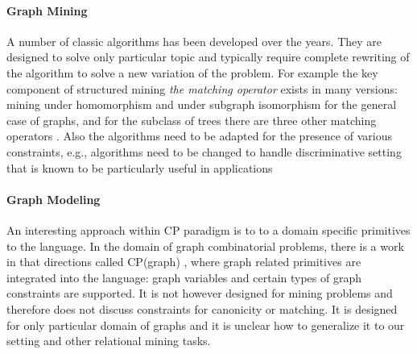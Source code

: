 
\paragraph{Graph Mining} A number of classic algorithms has been developed over the years. They are designed to solve only particular topic and typically require complete rewriting of the algorithm to solve a new variation of the problem. For example the key component of structured mining \textit{the matching operator} exists in many versions: mining under homomorphism \citep{theta_subsumption} and under subgraph isomorphism \citep{gspan} for the general case of graphs, and for the subclass of trees there are three other matching operators \citep{subtree_overview}. Also the algorithms need to be adapted for the presence of various constraints, e.g., algorithms need to be changed to handle discriminative setting that is known to be particularly useful in applications \citep{pattern_mining_classification}

\paragraph{Graph Modeling} An interesting approach within CP paradigm is to to a domain specific primitives to the language. In the domain of graph combinatorial problems, there is a work in that directions called CP(graph) \citep{cp_graph}, where graph related primitives are integrated into the language: graph variables and certain types of graph constraints are supported. It is not however designed for mining problems and therefore does not discuss constraints for canonicity or matching. It is designed for only particular domain of graphs and it is unclear how to generalize it to our setting and other relational mining tasks.
